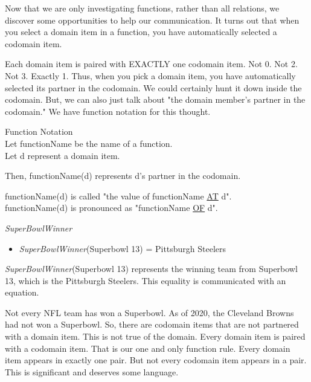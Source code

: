 \documentclass{ximera}
\begin{document}
Now that we are only investigating functions, rather than all relations, we discover some opportunities to help our communication.  It turns out that when you select a domain item in a function, you have automatically selected a codomain item.

Each domain item is paired with EXACTLY one codomain item.  Not 0. Not 2.  Not 3.  Exactly 1.  Thus, when you pick a domain item, you have automatically selected its partner in the codomain.  We could certainly hunt it down inside the codomain.  But, we can also just talk about "the domain member's partner in the codomain."  We have function notation for this thought.

\begin{notation} Function Notation \\

Let functionName be the name of a function. \\
Let d represent a domain item.

Then, functionName(d) represents d's partner in the codomain.

functionName(d) is called "the value of functionName \underline{AT} d". \\
functionName(d) is pronounced as "functionName \underline{OF} d".
\end{notation}



\begin{example} \textit{SuperBowlWinner}

\begin{itemize}
\item \textit{SuperBowlWinner}(Superbowl 13) = Pittsburgh Steelers  
\end{itemize}

\textit{SuperBowlWinner}(Superbowl 13) represents the winning team from Superbowl 13, which is the Pittsburgh Steelers.  This equality is communicated with an equation.

\end{example}

Not every NFL team has won a Superbowl. As of 2020, the Cleveland Browns had not won a Superbowl.  So, there are codomain items that are not partnered with a domain item.  This is not true of the domain.  Every domain item is paired with a codomain item.  That is our one and only function rule.  Every domain item appears in exactly one pair.  But not every codomain item appears in a pair.  This is significant and deserves some language.
\end{document}
